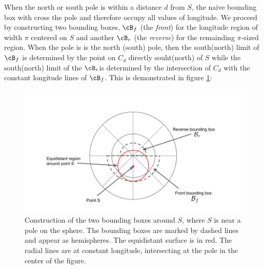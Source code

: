 \documentclass[preprint,12pt]{article}
\begin{document}
When the north or south pole is within a distance $d$ from $S$, the naive bounding box with cross the pole and therefore occupy all values of longitude. We proceed by constructing two bounding boxes, $\cB_f$ (the {\it front}) for the longitude region of width $\pi$ centered on $S$ and another $\cB_r$ (the {\it reverse}) for the remainding $\pi$-sized region. When the pole is is the north (south) pole, then the south(north) limit of $\cB_f$ is determined by the point on $C_d$ directly souht(north) of $S$ while the south(north) limit of the $\cB_r$is determined by the intersection of $C_d$ with the constant longitude lines of $\cB_f$. This is demonstrated in figure \ref{fig:bbox_reverse}:
\begin{figure}[bth!]
  \includegraphics[width=\linewidth]{bbox_reverse}
  \caption{Construction of the two bounding boxes around $S$, where $S$ is near a pole on the sphere. The bounding boxes are marked by dashed lines and appear as hemispheres.  The equidistant surface is in red. The radial lines are at constant longitude, intersecting at the pole in the center of the figure.}
  \label{fig:bbox_reverse}
\end{figure}

 


\end{document}
